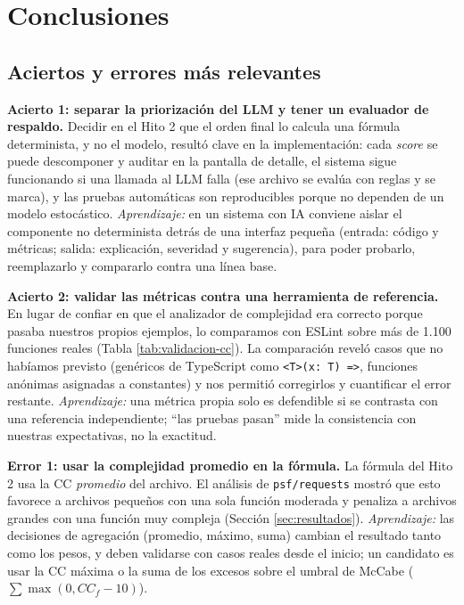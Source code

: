 \pagebreak\section{Conclusiones}
\label{sec:conclusiones}

\subsection{Aciertos y errores más relevantes}

\textbf{Acierto 1: separar la priorización del LLM y tener un evaluador de respaldo.} Decidir en el Hito 2 que el orden final lo calcula una fórmula determinista, y no el modelo, resultó clave en la implementación: cada \textit{score} se puede descomponer y auditar en la pantalla de detalle, el sistema sigue funcionando si una llamada al LLM falla (ese archivo se evalúa con reglas y se marca), y las pruebas automáticas son reproducibles porque no dependen de un modelo estocástico. \textit{Aprendizaje:} en un sistema con IA conviene aislar el componente no determinista detrás de una interfaz pequeña (entrada: código y métricas; salida: explicación, severidad y sugerencia), para poder probarlo, reemplazarlo y compararlo contra una línea base.

\textbf{Acierto 2: validar las métricas contra una herramienta de referencia.} En lugar de confiar en que el analizador de complejidad era correcto porque pasaba nuestros propios ejemplos, lo comparamos con ESLint sobre más de 1.100 funciones reales (Tabla \ref{tab:validacion-cc}). La comparación reveló casos que no habíamos previsto (genéricos de TypeScript como \texttt{<T>(x: T) =>}, funciones anónimas asignadas a constantes) y nos permitió corregirlos y cuantificar el error restante. \textit{Aprendizaje:} una métrica propia solo es defendible si se contrasta con una referencia independiente; ``las pruebas pasan'' mide la consistencia con nuestras expectativas, no la exactitud.

\textbf{Error 1: usar la complejidad promedio en la fórmula.} La fórmula del Hito 2 usa la CC \emph{promedio} del archivo. El análisis de \texttt{psf/requests} mostró que esto favorece a archivos pequeños con una sola función moderada y penaliza a archivos grandes con una función muy compleja (Sección \ref{sec:resultados}). \textit{Aprendizaje:} las decisiones de agregación (promedio, máximo, suma) cambian el resultado tanto como los pesos, y deben validarse con casos reales desde el inicio; un candidato es usar la CC máxima o la suma de los excesos sobre el umbral de McCabe ($\sum \max(0, CC_f - 10)$).

